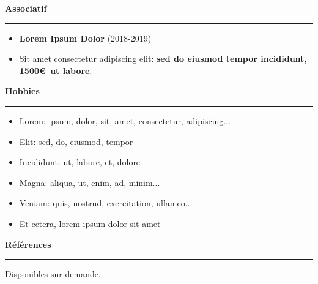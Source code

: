 \documentclass[letterpaper]{article}
\newcommand{\sectionheader}[1]{
    \vspace{8pt}
    \noindent\textbf{\large #1}
    \vspace{4pt}
    \hrule
    \vspace{6pt}
}
\begin{document}
\vspace{6pt}

\sectionheader{Associatif}
\begin{itemize}
    \item \textbf{Lorem Ipsum Dolor} (2018-2019)
    \item Sit amet consectetur adipiscing elit: \textbf{sed do eiusmod tempor incididunt, 1500\euro~ut labore}.
\end{itemize}

\sectionheader{Hobbies}
\begin{itemize}
    \item Lorem: ipsum, dolor, sit, amet, consectetur, adipiscing...
    \item Elit: sed, do, eiusmod, tempor
    \item Incididunt: ut, labore, et, dolore
    \item Magna: aliqua, ut, enim, ad, minim...
    \item Veniam: quis, nostrud, exercitation, ullamco...
    \item Et cetera, lorem ipsum dolor sit amet
\end{itemize}

\vspace{6pt}

\sectionheader{Références}
Disponibles sur demande.
\end{document}
